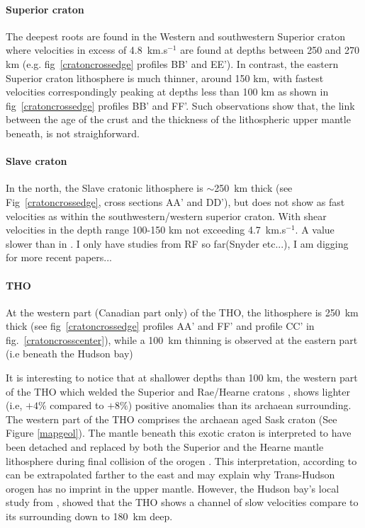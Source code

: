 \documentclass[12pt]{article}
\begin{document}
		\paragraph{Superior craton}
		The deepest roots are found in the Western and southwestern Superior craton where velocities in excess of 4.8~km.s$^{-1}$ are found at depths between 250 and 270 km (e.g. fig~\ref{cratoncrossedge} profiles BB' and EE'). 
		In contrast, the eastern Superior craton lithosphere is much thinner, around 150 km, with fastest velocities correspondingly peaking at depths less than 100 km as shown in fig~\ref{cratoncrossedge} profiles BB' and FF'. Such observations show that, the link between the age of the crust and the thickness of the lithospheric upper mantle beneath, is not straighforward. 

		\paragraph{Slave craton}
		In the north, the Slave cratonic lithosphere is $\sim$250~km thick (see Fig~\ref{cratoncrossedge}, cross sections AA' and DD'), but does not show as fast velocities as within the southwestern/western superior craton. 
		With shear velocities in the depth range 100-150 km not exceeding 4.7~km.s$^{-1}$. A value slower than in \cite{chen2007new}. I only have studies from RF so far(Snyder etc...), I am digging for more recent papers...

		\paragraph{THO}
		At the western part (Canadian part only) of the THO, the lithosphere is 250~km thick (see fig~\ref{cratoncrossedge} profiles AA' and FF' and profile CC' in fig.~\ref{cratoncrosscenter}), while a 100~km thinning is observed at the eastern part (i.e beneath the Hudson bay)
		 
		It is interesting to notice that at shallower depths than 100 km, the western part of the THO which welded the Superior and Rae/Hearne cratons \citep{hoffman1988united}, shows lighter (i.e, $+4\%$ compared to $+8\%$) positive anomalies than its archaean surrounding. 
		The western part of the THO comprises the archaean aged Sask craton (See Figure \ref{mapgeol}).
		The mantle beneath this exotic craton is interpreted to have been detached and replaced by both the Superior and the Hearne mantle lithosphere during final collision of the orogen \citep{nemeth2005lithospheric}. 
		This interpretation, according to \cite{faure2011seismic} can be extrapolated farther to the east and may explain why Trans-Hudson orogen has no imprint in the upper mantle. However, the Hudson bay's local study from \cite{darbyshire2013seismic} , showed that the THO shows a channel of slow velocities compare to its surrounding down to 180~km deep.
\end{document}
